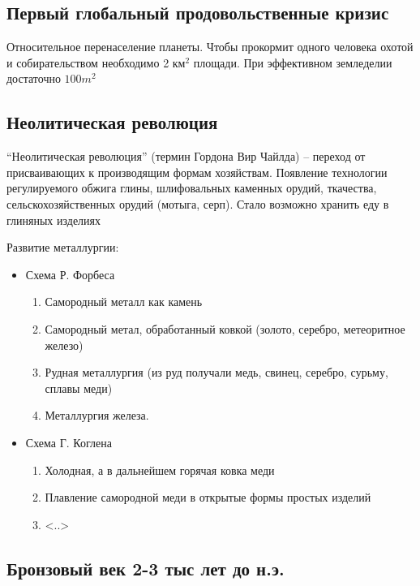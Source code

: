 \documentclass{book}
\theoremstyle{definition}
\begin{document}
    \subsection{Первый глобальный продовольственные кризис}

    Относительное перенаселение планеты. Чтобы прокормит одного человека охотой и собирательством необходимо 2 км${}^2$ площади. При эффективном земледелии достаточно $100m^2$

    \subsection{Неолитическая революция}

    ``Неолитическая революция'' (термин Гордона Вир Чайлда) -- переход от присваивающих к производящим формам хозяйствам. Появление технологии регулируемого обжига глины, шлифовальных каменных орудий, ткачества, сельскохозяйственных орудий (мотыга, серп). Стало возможно хранить еду в глиняных изделиях

    Развитие металлургии:
    \begin{itemize}
        \item Схема Р. Форбеса
            \begin{enumerate}
                \item Самородный металл как камень
                \item Самородный метал, обработанный ковкой (золото, серебро, метеоритное железо)
                \item Рудная металлургия (из руд получали медь, свинец, серебро, сурьму, сплавы меди)
                \item Металлургия железа.
            \end{enumerate}
        \item Схема Г. Коглена
            \begin{enumerate}
                \item Холодная, а в дальнейшем горячая ковка меди
                \item Плавление самородной меди в открытые формы простых изделий
                \item <..>
            \end{enumerate}
    \end{itemize}

    \subsection{Бронзовый век 2-3 тыс лет до н.э.}
\end{document}
